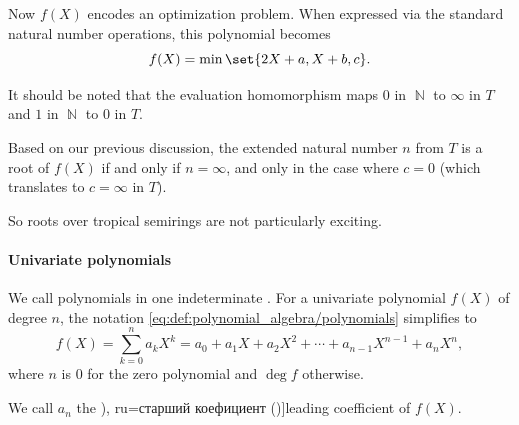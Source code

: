 \begin{example}
\begin{thmenum}
    Now \( f(X) \) encodes an optimization problem. When expressed via the standard natural number operations, this polynomial becomes
    \begin{equation*}
      f(X) = \min\set{ 2X + a, X + b, c }.
    \end{equation*}

    It should be noted that the evaluation homomorphism maps \( 0 \) in \( \BbbN \) to \( \infty \) in \( T \) and \( 1 \) in \( \BbbN \) to \( 0 \) in \( T \).

    Based on our previous discussion, the extended natural number \( n \) from \( T \) is a root of \( f(X) \) if and only if \( n = \infty \), and only in the case where \( c = 0 \) (which translates to \( c = \infty \) in \( T \)).

    So roots over tropical semirings are not particularly exciting.
  \end{thmenum}
\end{example}

\paragraph{Univariate polynomials}

\begin{definition}\label{def:univariate_polynomial}\mimprovised
  We call polynomials in one indeterminate . For a univariate polynomial \( f(X) \) of degree \( n \), the notation \eqref{eq:def:polynomial_algebra/polynomials} simplifies to
  \begin{equation}\label{eq:def:univariate_polynomial}
    f(X) = \sum_{k=0}^n a_k X^k = a_0 + a_1 X + a_2 X^2 + \cdots + a_{n-1} X^{n-1} + a_n X^n,
  \end{equation}
  where \( n \) is \( 0 \) for the zero polynomial and \( \deg f \) otherwise.

  We call \( a_n \) the \term[bg=старши коефициент (\cite[23]{ГеновМиховскиМоллов1991Алгебра}), ru=старший коефициент (\cite[118]{Тыртышников2007ЛинейнаяАлгебра})]{leading coefficient} of \( f(X) \).
\end{definition}

